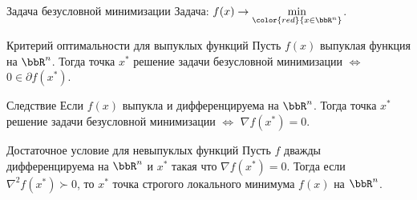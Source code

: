 \documentclass[12pt]{beamer}
\begin{document}
\begin{frame}{Задача безусловной минимизации}
Задача: $f(x) \rightarrow \min\limits_{\color{red}{x \in \bbR^n}}$.

\begin{block}{Критерий оптимальности для выпуклых функций}
Пусть $f(x)$ выпуклая функция на $\bbR^n$. 
Тогда точка $x^*$ решение задачи безусловной минимизации $\Leftrightarrow$ $0 \in \partial f(x^*)$.
\end{block}

\begin{block}{Следствие}
Если $f(x)$ выпукла и дифференцируема на $\bbR^n$.
Тогда точка $x^*$ решение задачи безусловной минимизации $\Leftrightarrow$ $\nabla f(x^*) = 0$.
\end{block}

\begin{block}{Достаточное условие для невыпуклых функций}
Пусть $f$ дважды дифференцируема на $\bbR^n$ и $x^*$ такая что $\nabla f(x^*) = 0$. 
Тогда если $\nabla^2 f(x^*) \succ 0$, то $x^*$ точка строгого локального минимума $f(x)$ на $\bbR^n$.  
\end{block}

\end{frame}

\end{document}
